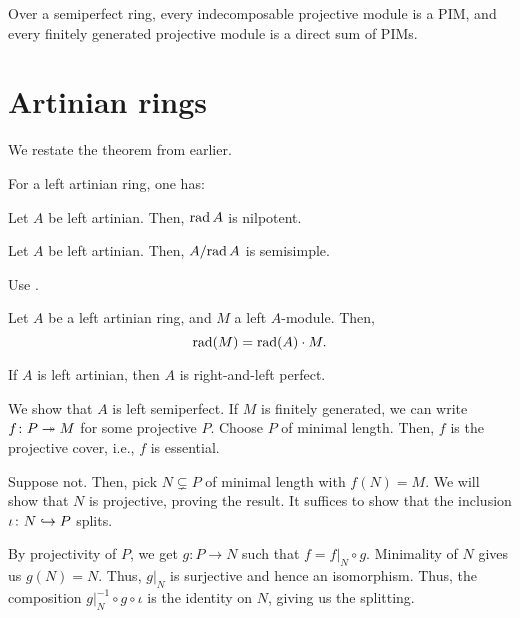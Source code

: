 \documentclass[12pt]{article}
\begin{document}
\begin{thm}
	Over a semiperfect ring, every indecomposable projective module is a PIM, 
	and every finitely generated projective module is a direct sum of PIMs.
\end{thm}

\section{Artinian rings}

We restate the theorem from earlier.

\begin{thm}
	For a left artinian ring, one has:

\end{thm}

\begin{thm}
	Let $A$ be left artinian. Then, $\operatorname{rad} A$ is nilpotent.
\end{thm}

\begin{thm}
	Let $A$ be left artinian. Then, $A/{\operatorname{rad} A}$ is semisimple.
\end{thm}
\begin{sketch}
Use .
\end{sketch}

\begin{thm} \label{thm:radical-module-over-artinian}
	Let $A$ be a left artinian ring, and $M$ a left $A$-module. 
	Then,
	\begin{equation*} 
		\operatorname{rad}(M) = \operatorname{rad}(A) \cdot M.
	\end{equation*}
\end{thm}

\begin{thm}
	If $A$ is left artinian, then $A$ is right-and-left perfect.
\end{thm}
\begin{sketch}
	We show that $A$ is left semiperfect. 
	If $M$ is finitely generated, we can write $f \colon P \twoheadrightarrow M$ for some projective $P$. 
	Choose $P$ of minimal length. Then, $f$ is the projective cover, i.e., $f$ is essential.

	Suppose not. Then, pick $N \subsetneq P$ of minimal length with $f(N) = M$. 
	We will show that $N$ is projective, proving the result. 
	It suffices to show that the inclusion $\iota \colon N \hookrightarrow P$ splits.

	By projectivity of $P$, we get $g \colon P \to N$ such that $f = f|_{N} \circ g$. 
	Minimality of $N$ gives us $g(N) = N$. 
	Thus, $g|_{N}$ is surjective and hence an isomorphism. 
	Thus, the composition $g|_{N}^{-1} \circ g \circ \iota$ is the identity on $N$, giving us the splitting.
\end{sketch}
\end{document}
